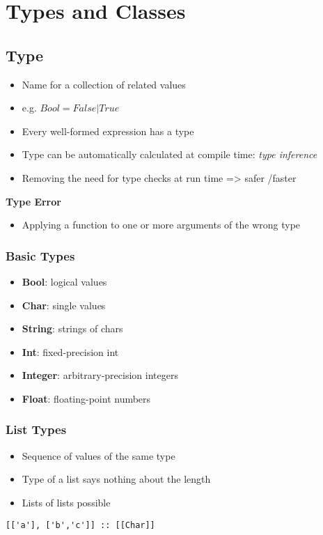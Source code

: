 
\section{Types and Classes}
\subsection{Type}
\begin{itemize}
    \item Name for a collection of related values
    \item e.g. $Bool = False | True$
    \item Every well-formed expression has a type
    \item Type can be automatically calculated at compile time: \textit{type inference}
    \item Removing the need for type checks at run time => safer /faster
\end{itemize}
\textbf{Type Error}
\begin{itemize}
    \item Applying a function to one or more arguments of the wrong type
\end{itemize}

\subsubsection{Basic Types}
\begin{itemize}
    \item \textbf{Bool}: logical values
    \item \textbf{Char}: single values
    \item \textbf{String}: strings of chars
    \item \textbf{Int}: fixed-precision int
    \item \textbf{Integer}: arbitrary-precision integers
    \item \textbf{Float}: floating-point numbers
\end{itemize}

\subsubsection{List Types}
\begin{itemize}
    \item Sequence of values of the same type
    \item Type of a list says nothing about the length
    \item Lists of lists possible
\end{itemize}
\begin{lstlisting}
[['a'], ['b','c']] :: [[Char]]
\end{lstlisting}

